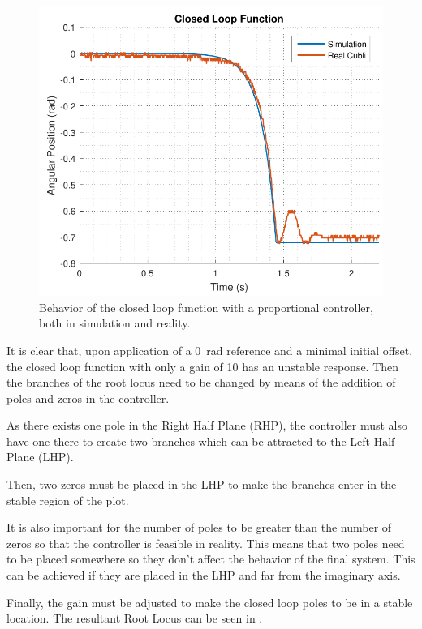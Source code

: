 \begin{figure}[H] 
	\centering 
	\includegraphics[scale=0.75]{figures/closedLoopResponse}	
	\caption{Behavior of the closed loop function with a proportional controller, both in simulation and reality.}
	\label{closedLoopResponse}
\end{figure}
%
It is clear that, upon application of a \SI{0}{rad} reference and a minimal initial offset, the closed loop function with only a gain of 10 has an unstable response. Then the branches of the root locus need to be changed by means of the addition of poles and zeros in the controller.

As there exists one pole in the Right Half Plane (RHP), the controller must also have one there to create two branches which can be attracted to the Left Half Plane (LHP).

Then, two zeros must be placed in the LHP to make the branches enter in the stable region of the plot.

It is also important for the number of poles to be greater than the number of zeros so that the controller is feasible in reality. This means that two poles need to be placed somewhere so they don't affect the behavior of the final system. This can be achieved if they are placed in the LHP and far from the imaginary axis.

Finally, the gain must be adjusted to make the closed loop poles to be in a stable location. The resultant Root Locus can be seen in .

